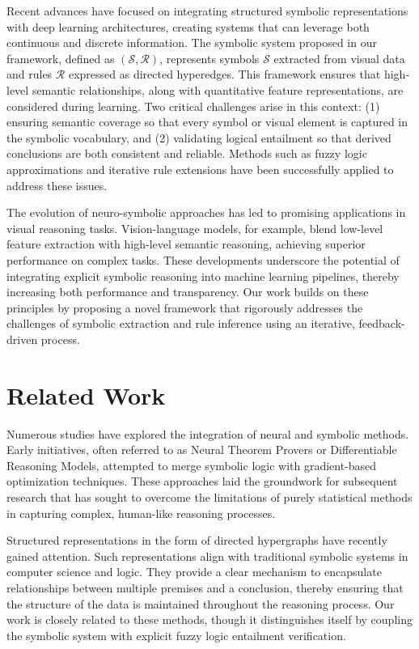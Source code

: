 \documentclass[11pt]{article}
\begin{document}
Recent advances have focused on integrating structured symbolic representations with deep learning architectures, creating systems that can leverage both continuous and discrete information. The symbolic system proposed in our framework, defined as \((\mathcal{S}, \mathcal{R})\), represents symbols \( \mathcal{S} \) extracted from visual data and rules \( \mathcal{R} \) expressed as directed hyperedges. This framework ensures that high-level semantic relationships, along with quantitative feature representations, are considered during learning. Two critical challenges arise in this context: (1) ensuring semantic coverage so that every symbol or visual element is captured in the symbolic vocabulary, and (2) validating logical entailment so that derived conclusions are both consistent and reliable. Methods such as fuzzy logic approximations and iterative rule extensions have been successfully applied to address these issues.

The evolution of neuro-symbolic approaches has led to promising applications in visual reasoning tasks. Vision-language models, for example, blend low-level feature extraction with high-level semantic reasoning, achieving superior performance on complex tasks. These developments underscore the potential of integrating explicit symbolic reasoning into machine learning pipelines, thereby increasing both performance and transparency. Our work builds on these principles by proposing a novel framework that rigorously addresses the challenges of symbolic extraction and rule inference using an iterative, feedback-driven process.

\section{Related Work}
Numerous studies have explored the integration of neural and symbolic methods. Early initiatives, often referred to as Neural Theorem Provers or Differentiable Reasoning Models, attempted to merge symbolic logic with gradient-based optimization techniques. These approaches laid the groundwork for subsequent research that has sought to overcome the limitations of purely statistical methods in capturing complex, human-like reasoning processes.

Structured representations in the form of directed hypergraphs have recently gained attention. Such representations align with traditional symbolic systems in computer science and logic. They provide a clear mechanism to encapsulate relationships between multiple premises and a conclusion, thereby ensuring that the structure of the data is maintained throughout the reasoning process. Our work is closely related to these methods, though it distinguishes itself by coupling the symbolic system with explicit fuzzy logic entailment verification.
\end{document}
